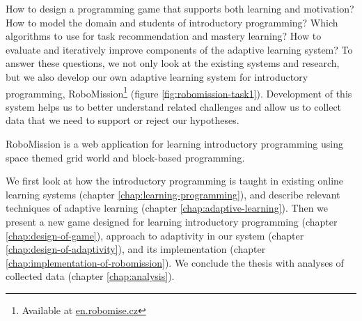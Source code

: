 
How to design a programming game that supports both learning and motivation?
How to model the domain and students of introductory programming?
Which algorithms to use for task recommendation and mastery learning?
How to evaluate and iteratively improve components of the adaptive learning system?
To answer these questions, we not only look at the existing systems
and research, but we also develop our own adaptive learning system for
introductory programming, RoboMission\footnote{Available at \url{en.robomise.cz}}
(figure \ref{fig:robomission-task1}).
Development of this system helps us to better understand related challenges
and allow us to collect data that we need to support or reject our hypotheses.

%
  {RoboMission is a web application for learning introductory programming %
   using space themed grid world and block-based programming.}

We first look at how the introductory programming is taught
in existing online learning systems
(chapter \ref{chap:learning-programming}),
and describe relevant techniques of adaptive learning
(chapter \ref{chap:adaptive-learning}).
Then we present a new game designed for learning introductory programming
(chapter \ref{chap:design-of-game}),
approach to adaptivity in our system (chapter \ref{chap:design-of-adaptivity}),
and its implementation (chapter \ref{chap:implementation-of-robomission}).
We conclude the thesis with analyses of collected data
(chapter \ref{chap:analysis}).
